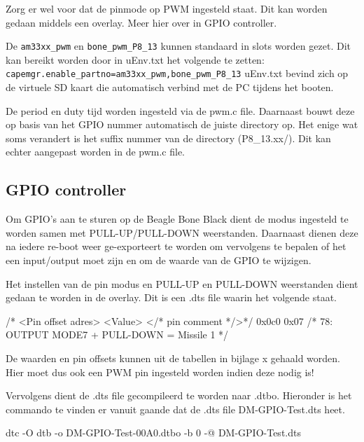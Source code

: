 
Zorg er wel voor dat de pinmode op PWM ingesteld staat. Dit kan worden gedaan
middels een overlay. Meer hier over in GPIO controller.

De \texttt{am33xx\_pwm} en \texttt{bone\_pwm\_P8\_13} kunnen standaard in slots worden gezet. Dit kan
bereikt worden door in uEnv.txt het volgende te zetten:
\texttt{capemgr.enable\_partno=am33xx\_pwm,bone\_pwm\_P8\_13}
uEnv.txt bevind zich op de virtuele SD kaart die automatisch verbind met de PC
tijdens het booten.

De period en duty tijd worden ingesteld via de pwm.c file. Daarnaast bouwt deze op
basis van het GPIO nummer automatisch de juiste directory op. Het enige wat
soms verandert is het suffix nummer van de directory (P8\_13.xx/). Dit kan echter
aangepast worden in de pwm.c file.

\subsection{GPIO controller}
\label{sub:gpiocontr}
Om GPIO's aan te sturen op de Beagle Bone Black dient de modus ingesteld te worden
samen met PULL-UP/PULL-DOWN weerstanden. Daarnaast dienen deze na iedere re-boot
weer ge-exporteert te worden om vervolgens te bepalen of het een input/output moet
zijn en om de waarde van de GPIO te wijzigen.

Het instellen van de pin modus en PULL-UP en PULL-DOWN weerstanden dient gedaan te
worden in de overlay. Dit is een .dts file waarin het volgende staat.

\begin{cppcode}
/* <Pin offset adres> <Value> </* pin comment */>*/
          0x0c0        0x07    /* 78: OUTPUT MODE7 + PULL-DOWN = Missile 1     */
\end{cppcode}

De waarden en pin offsets kunnen uit de tabellen in bijlage x gehaald worden. Hier
moet dus ook een PWM pin ingesteld worden indien deze nodig is!

Vervolgens dient de .dts file gecompileerd te worden naar .dtbo. Hieronder is het
commando te vinden er vanuit gaande dat de .dts file DM-GPIO-Test.dts heet.

\begin{cppcode}
dtc -O dtb -o DM-GPIO-Test-00A0.dtbo -b 0 -@ DM-GPIO-Test.dts
\end{cppcode}

